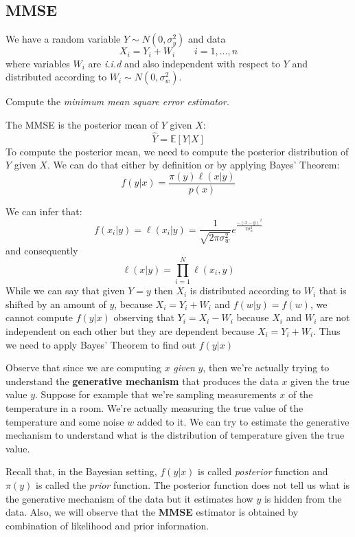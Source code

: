 \subsection{MMSE}
\begin{exercise}
    We have a random variable $Y \sim N(0, \sigma^2_y)$ and data
    \[
        X_i = Y_i + W_i \qquad i = 1, \dots, n
    \]
    where variables $W_i$ are \textit{i.i.d} and also independent with respect to $Y$ and distributed according to $W_i \sim N(0, \sigma_w^2)$.

    Compute the \textit{minimum mean square error estimator}.
\end{exercise}

The MMSE is the posterior mean of $Y$ given $X$:
\[
    \hat{Y} = \mathbb{E}\left[ Y | X\right]
\]
To compute the posterior mean, we need to compute the posterior distribution of $Y$ given $X$. We can do that either by definition or by applying Bayes' Theorem:
\[
    f(y|x) = \frac{\pi(y) \ell(x|y)}{p(x)}
\]


We can infer that:
\[
    f(x_i|y) = \ell(x_i|y) = \frac{1}{\sqrt{2\pi \sigma^2_w}} e^{\frac{-(x-y)^2}{2\sigma_w^2}}
\]
and consequently
\[
    \ell(x|y) = \prod_{i = 1}^{N} \ell(x_i, y)
\]
While we can say that given $Y=y$ then $X_i$ is distributed according to $W_i$ that is shifted by an amount of $y$, because $X_i = Y_i + W_i$ and $f(w|y) = f(w)$, we cannot compute $f(y|x)$ observing that $Y_i = X_i - W_i$ because $X_i$ and $W_i$ are not independent on each other but they are dependent because $X_i = Y_i + W_i$. Thus we need to apply Bayes' Theorem to find out $f(y|x)$%

Observe that since we are computing $x$ \textit{given} $y$, then we're actually trying to understand the \textbf{generative mechanism} that produces the data $x$ given the true value $y$. Suppose for example that we're sampling measurements $x$ of the temperature in a room. We're actually measuring the true value of the temperature and some noise $w$ added to it. We can try to estimate the generative mechanism to understand what is the distribution of temperature given the true value.

Recall that, in the Bayesian setting, $f(y|x)$ is called \textit{posterior} function and $\pi(y)$ is called the \textit{prior} function. The posterior function does not tell us what is the generative mechanism of the data but it estimates how $y$ is hidden from the data. Also, we will observe that the \textbf{MMSE} estimator is obtained by combination of likelihood and prior information.

